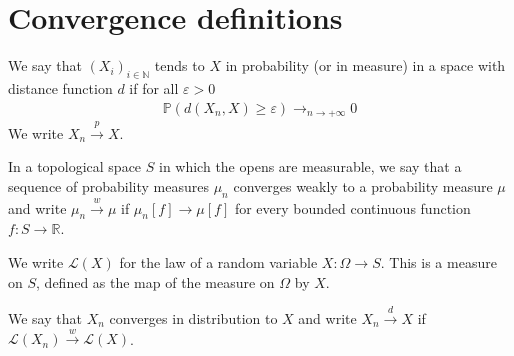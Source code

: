 \chapter{Convergence definitions}

\begin{definition}\label{def:cvg_probability}
 \leanok
We say that $(X_i)_{i \in \mathbb{N}}$ tends to $X$ in probability (or in measure) in a space with distance function $d$ if for all $\varepsilon > 0$
\begin{align*}
\mathbb{P}(d(X_n, X) \ge \varepsilon) \to_{n \to +\infty} 0
\end{align*}
We write $X_n \xrightarrow{p} X$.
\end{definition}

\begin{definition}\label{def:weak_cvg_measure}
 \leanok
In a topological space $S$ in which the opens are measurable, we say that a sequence of probability measures $\mu_n$ converges weakly to a probability measure $\mu$ and write $\mu_n \xrightarrow{w} \mu$ if $\mu_n[f] \to \mu[f]$ for every bounded continuous function $f : S \to \mathbb{R}$.
\end{definition}

We write $\mathcal L(X)$ for the law of a random variable $X : \Omega \to S$. This is a measure on $S$, defined as the map of the measure on $\Omega$ by $X$.

\begin{definition}\label{def:cvg_distribution}
We say that $X_n$ converges in distribution to $X$ and write $X_n \xrightarrow{d} X$ if $\mathcal L(X_n) \xrightarrow{w} \mathcal L(X)$.
\end{definition}